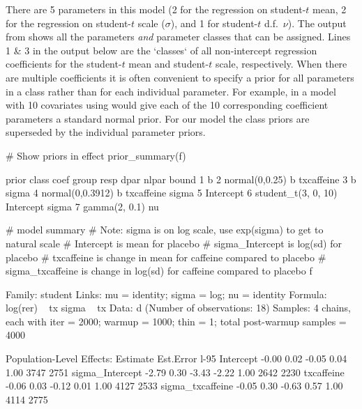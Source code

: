 There are 5 parameters in this model (2 for the regression on student-$t$ mean, 2 for the regression on student-$t$ scale ($\sigma$), and 1 for student-$t$ d.f.\ $\nu$). The output from  shows all the parameters \emph{and} parameter classes that can be assigned. Lines 1 \& 3 in the output below are the `classes` of all non-intercept regression coefficients for the student-$t$ mean and student-$t$ scale, respectively. When there are multiple coefficients it is often convenient to specify a prior for all parameters in a class rather than for each individual parameter. For example, in a model with 10 covariates using  would give each of the 10 corresponding coefficient parameters a standard normal prior. For our model the class priors are superseded by the individual parameter priors.
\begin{Schunk}
\begin{Sinput}
# Show priors in effect
prior_summary(f)
\end{Sinput}
\begin{Soutput}
                prior     class       coef group resp  dpar nlpar bound
1                             b                                        
2      normal(0,0.25)         b txcaffeine                             
3                             b                       sigma            
4    normal(0,0.3912)         b txcaffeine            sigma            
5                     Intercept                                        
6 student_t(3, 0, 10) Intercept                       sigma            
7       gamma(2, 0.1)        nu                                        
\end{Soutput}
\begin{Sinput}
# model summary
# Note: sigma is on log scale, use exp(sigma) to get to natural scale
# Intercept is mean for placebo
# sigma_Intercept is log(sd) for placebo
# txcaffeine is change in mean for caffeine compared to placebo
# sigma_txcaffeine is change in log(sd) for caffeine compared to placebo
f
\end{Sinput}
\begin{Soutput}
 Family: student 
  Links: mu = identity; sigma = log; nu = identity 
Formula: log(rer) ~ tx 
         sigma ~ tx
   Data: d (Number of observations: 18) 
Samples: 4 chains, each with iter = 2000; warmup = 1000; thin = 1;
         total post-warmup samples = 4000

Population-Level Effects: 
                 Estimate Est.Error l-95%
Intercept           -0.00      0.02    -0.05     0.04 1.00     3747     2751
sigma_Intercept     -2.79      0.30    -3.43    -2.22 1.00     2642     2230
txcaffeine          -0.06      0.03    -0.12     0.01 1.00     4127     2533
sigma_txcaffeine    -0.05      0.30    -0.63     0.57 1.00     4114     2775


\end{Soutput}
\end{Schunk}
